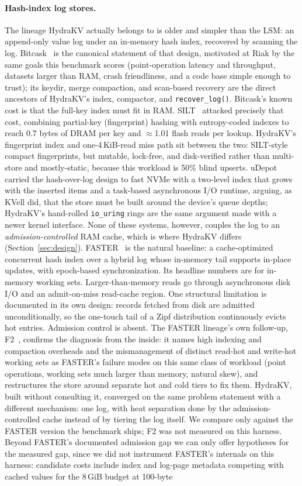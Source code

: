 \documentclass{article}
\newcommand{\MemBudget}{8\,GiB}
\begin{document}
\paragraph{Hash-index log stores.} The lineage HydraKV actually belongs to is older and simpler than the LSM: an append-only value log under an in-memory hash index, recovered by scanning the log. Bitcask~\cite{bitcask} is the canonical statement of that design, motivated at Riak by the same goals this benchmark scores (point-operation latency and throughput, datasets larger than RAM, crash friendliness, and a code base simple enough to trust); its keydir, merge compaction, and scan-based recovery are the direct ancestors of HydraKV's index, compactor, and \texttt{recover\_log()}. Bitcask's known cost is that the full-key index must fit in RAM. SILT~\cite{silt} attacked precisely that cost, combining partial-key (fingerprint) hashing with entropy-coded indexes to reach 0.7 bytes of DRAM per key and $\approx$1.01 flash reads per lookup. HydraKV's fingerprint index and one-4\,KiB-read miss path sit between the two: SILT-style compact fingerprints, but mutable, lock-free, and disk-verified rather than multi-store and mostly-static, because this workload is 50\% blind upserts. uDepot~\cite{udepot} carried the hash-over-log design to fast NVMe with a two-level index that grows with the inserted items and a task-based asynchronous I/O runtime, arguing, as KVell did, that the store must be built around the device's queue depths; HydraKV's hand-rolled \texttt{io\_uring} rings are the same argument made with a newer kernel interface. None of these systems, however, couples the log to an \emph{admission-controlled} RAM cache, which is where HydraKV differs (Section~\ref{sec:design}). FASTER~\cite{faster} is the natural baseline: a cache-optimized concurrent hash index over a hybrid log whose in-memory tail supports in-place updates, with epoch-based synchronization. Its headline numbers are for in-memory working sets. Larger-than-memory reads go through asynchronous disk I/O and an admit-on-miss read-cache region. One structural limitation is documented in its own design: records fetched from disk are admitted unconditionally, so the one-touch tail of a Zipf distribution continuously evicts hot entries. Admission control is absent. The FASTER lineage's own follow-up, F2~\cite{ftwo}, confirms the diagnosis from the inside: it names high indexing and compaction overheads and the mismanagement of distinct read-hot and write-hot working sets as FASTER's failure modes on this same class of workload (point operations, working sets much larger than memory, natural skew), and restructures the store around separate hot and cold tiers to fix them. HydraKV, built without consulting it, converged on the same problem statement with a different mechanism: one log, with heat separation done by the admission-controlled cache instead of by tiering the log itself. We compare only against the FASTER version the benchmark ships; F2 was not measured on this harness. Beyond FASTER's documented admission gap we can only offer hypotheses for the measured gap, since we did not instrument FASTER's internals on this harness: candidate costs include index and log-page metadata competing with cached values for the \MemBudget{} budget at 100-byte 
\end{document}
